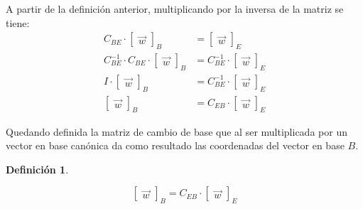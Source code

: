 \documentclass[a5paper,12pt,twoside]{book}
\newtheorem{defn}{{Definición}}[chapter]
\begin{document}
A partir de la definición anterior, multiplicando por la inversa de la matriz se tiene:
\begin{align*}
    C_{BE} \cdot
    \begin{bmatrix}
        \Vec{w}
    \end{bmatrix}_B
    &=
    \begin{bmatrix}
        \Vec{w}
    \end{bmatrix}_E
    \\[1ex]
    C_{BE}^{-1} \cdot C_{BE} \cdot
    \begin{bmatrix}
        \Vec{w}
    \end{bmatrix}_B
    &= C_{BE}^{-1} \cdot
    \begin{bmatrix}
        \Vec{w}
    \end{bmatrix}_E
    \\[1ex]
    I \cdot
    \begin{bmatrix}
        \Vec{w}
    \end{bmatrix}_B
    &= C_{BE}^{-1} \cdot
    \begin{bmatrix}
        \Vec{w}
    \end{bmatrix}_E
    \\[1ex]
    \begin{bmatrix}
        \Vec{w}
    \end{bmatrix}_B
    &= C_{EB} \cdot
    \begin{bmatrix}
        \Vec{w}
    \end{bmatrix}_E
\end{align*}

Quedando definida la matriz de cambio de base que al ser multiplicada por un vector en base canónica da como resultado las coordenadas del vector en base $B$.

\begin{mdframed}[style=MyFrame1]
    \begin{defn}
    \end{defn}
    \begin{equation*}
        \begin{bmatrix}
            \Vec{w}
        \end{bmatrix}_B
        = C_{EB} \cdot
        \begin{bmatrix}
            \Vec{w}
        \end{bmatrix}_E
    \end{equation*}
\end{mdframed}
\end{document}
